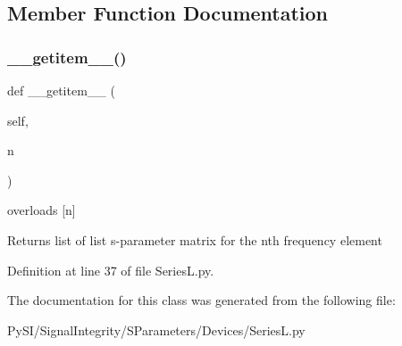 \subsection{Member Function Documentation}
\mbox{\label{classSignalIntegrity_1_1SParameters_1_1Devices_1_1SeriesL_1_1SeriesL_ab7a6da5139e0878b590d68292aaa70f2}} 
\subsubsection{\texorpdfstring{\+\_\+\+\_\+getitem\+\_\+\+\_\+()}{\_\_getitem\_\_()}}
{\footnotesize\ttfamily def \+\_\+\+\_\+getitem\+\_\+\+\_\+ (\begin{DoxyParamCaption}\item[{}]{self,  }\item[{}]{n }\end{DoxyParamCaption})}



overloads \mbox{[}n\mbox{]} 

\begin{DoxyReturn}{Returns}
list of list s-\/parameter matrix for the nth frequency element 
\end{DoxyReturn}


Definition at line 37 of file Series\+L.\+py.



The documentation for this class was generated from the following file\+:\begin{DoxyCompactItemize}
\item 
Py\+S\+I/\+Signal\+Integrity/\+S\+Parameters/\+Devices/Series\+L.\+py\end{DoxyCompactItemize}
